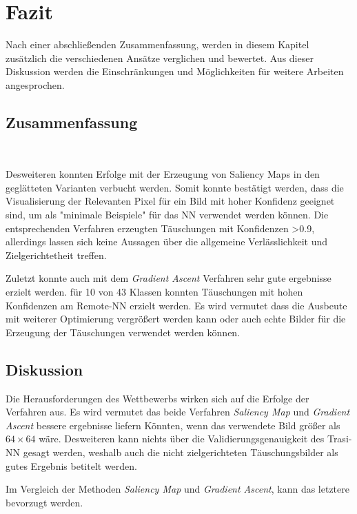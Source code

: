 \chapter{Fazit}
\label{cha:Fazit} \label{cha:Schluss}
Nach einer abschließenden Zusammenfassung, werden in diesem Kapitel zusätzlich die verschiedenen Ansätze verglichen und bewertet. Aus dieser Diskussion werden die Einschränkungen und Möglichkeiten für weitere Arbeiten angesprochen.

\section{Zusammenfassung} ~\newline 
{}

Desweiteren konnten Erfolge mit der Erzeugung von Saliency Maps in den geglätteten Varianten verbucht werden. Somit konnte bestätigt werden, dass die Visualisierung der Relevanten Pixel für ein Bild mit hoher Konfidenz geeignet sind, um als "minimale Beispiele" für das NN verwendet werden können. Die entsprechenden Verfahren erzeugten Täuschungen mit Konfidenzen >0.9, allerdings lassen sich keine Aussagen über die allgemeine Verlässlichkeit und Zielgerichtetheit treffen.

Zuletzt konnte auch mit dem \textit{Gradient Ascent} Verfahren sehr gute ergebnisse erzielt werden. für 10 von 43 Klassen konnten Täuschungen mit hohen Konfidenzen am Remote-NN erzielt werden. Es wird vermutet dass die Ausbeute mit weiterer Optimierung vergrößert werden kann oder auch echte Bilder für die Erzeugung der Täuschungen verwendet werden können.



\section{Diskussion}
Die Herausforderungen des Wettbewerbs wirken sich auf die Erfolge der Verfahren aus. Es wird vermutet das beide Verfahren \textit{Saliency Map} und \textit{Gradient Ascent} bessere ergebnisse liefern Könnten, wenn das verwendete Bild größer als $64\times64$ wäre. Desweiteren kann nichts über die Validierungsgenauigkeit des Trasi-NN gesagt werden, weshalb auch die nicht zielgerichteten Täuschungsbilder als gutes Ergebnis betitelt werden. 


Im Vergleich der Methoden \textit{Saliency Map} und \textit{Gradient Ascent}, kann das letztere bevorzugt werden. 



